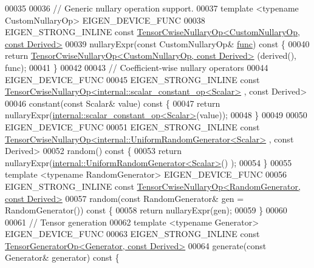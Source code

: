 \begin{DoxyCode}
00035 
00036     \textcolor{comment}{// Generic nullary operation support.}
00037     \textcolor{keyword}{template} <\textcolor{keyword}{typename} CustomNullaryOp> EIGEN\_DEVICE\_FUNC
00038     EIGEN\_STRONG\_INLINE \textcolor{keyword}{const} 
      \hyperlink{class_eigen_1_1_tensor_cwise_nullary_op}{TensorCwiseNullaryOp<CustomNullaryOp, const Derived>}
00039     nullaryExpr(\textcolor{keyword}{const} CustomNullaryOp& \hyperlink{structfunc}{func})\textcolor{keyword}{ const }\{
00040       \textcolor{keywordflow}{return} \hyperlink{class_eigen_1_1_tensor_cwise_nullary_op}{TensorCwiseNullaryOp<CustomNullaryOp, const Derived>}
      (derived(), func);
00041     \}
00042 
00043     \textcolor{comment}{// Coefficient-wise nullary operators}
00044     EIGEN\_DEVICE\_FUNC
00045     EIGEN\_STRONG\_INLINE \textcolor{keyword}{const} 
      \hyperlink{class_eigen_1_1_tensor_cwise_nullary_op}{TensorCwiseNullaryOp<internal::scalar\_constant\_op<Scalar>}
      , \textcolor{keyword}{const} Derived>
00046     constant(\textcolor{keyword}{const} Scalar& value)\textcolor{keyword}{ const }\{
00047       \textcolor{keywordflow}{return} nullaryExpr(\hyperlink{struct_eigen_1_1internal_1_1scalar__constant__op}{internal::scalar\_constant\_op<Scalar>}(value));
00048     \}
00049 
00050     EIGEN\_DEVICE\_FUNC
00051     EIGEN\_STRONG\_INLINE \textcolor{keyword}{const} 
      \hyperlink{class_eigen_1_1_tensor_cwise_nullary_op}{TensorCwiseNullaryOp<internal::UniformRandomGenerator<Scalar>}
      , \textcolor{keyword}{const} Derived>
00052     random()\textcolor{keyword}{ const }\{
00053       \textcolor{keywordflow}{return} nullaryExpr(\hyperlink{class_eigen_1_1internal_1_1_uniform_random_generator}{internal::UniformRandomGenerator<Scalar>}()
      );
00054     \}
00055     \textcolor{keyword}{template} <\textcolor{keyword}{typename} RandomGenerator> EIGEN\_DEVICE\_FUNC
00056     EIGEN\_STRONG\_INLINE \textcolor{keyword}{const} 
      \hyperlink{class_eigen_1_1_tensor_cwise_nullary_op}{TensorCwiseNullaryOp<RandomGenerator, const Derived>}
00057     random(\textcolor{keyword}{const} RandomGenerator& gen = RandomGenerator())\textcolor{keyword}{ const }\{
00058       \textcolor{keywordflow}{return} nullaryExpr(gen);
00059     \}
00060 
00061     \textcolor{comment}{// Tensor generation}
00062     \textcolor{keyword}{template} <\textcolor{keyword}{typename} Generator> EIGEN\_DEVICE\_FUNC
00063     EIGEN\_STRONG\_INLINE \textcolor{keyword}{const} \hyperlink{class_eigen_1_1_tensor_generator_op}{TensorGeneratorOp<Generator, const Derived>}
00064     generate(\textcolor{keyword}{const} Generator& generator)\textcolor{keyword}{ const }\{

\end{DoxyCode}
